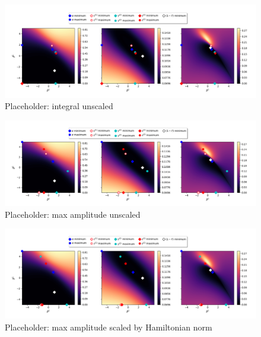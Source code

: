 \begin{figure}[t]
\centering
\includegraphics[width=\linewidth]{images/2_spins_Integrals_no_norm_final.png} \caption{Placeholder: integral unscaled}\label{fig:}
\end{figure}

\begin{figure}[t]
\centering
\includegraphics[width=\linewidth]{images/2spin_Maximums_no_norm_final} \caption{Placeholder: max amplitude unscaled}\label{fig:}
\end{figure}

\begin{figure}[t]
\centering
\includegraphics[width=\linewidth]{images/2spins_Maximums_scaled_by_norm_final.png} \caption{Placeholder: max amplitude scaled by Hamiltonian norm}\label{fig:}
\end{figure}

